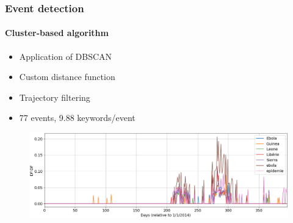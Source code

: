 \documentclass{beamer}
\begin{document}
\begin{frame}
\frametitle{Event detection}
\framesubtitle{Cluster-based algorithm}

\begin{itemize}
\item Application of DBSCAN \citep{dbscan}
\item Custom distance function
\item Trajectory filtering
\item 77 events, 9.88 keywords/event
\end{itemize}

\begin{figure}
\centering
\includegraphics[width=\linewidth,height=\textheight,keepaspectratio]{ebola}
\end{figure}
\end{frame}
\end{document}
